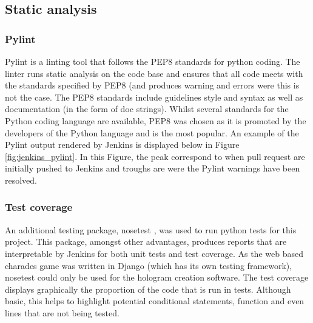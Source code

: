 \subsection{Static analysis}
\subsubsection{Pylint}
Pylint is a linting tool that follows the PEP8 standards \cite{pep8} for python coding. The linter runs static analysis on the code base and ensures that all code meets with the standards specified by PEP8 (and produces warning and errors were this is not the case. The PEP8 standards include guidelines style and syntax as well as documentation (in the form of doc strings). Whilst several standards for the Python coding language are available, PEP8 was chosen as it is promoted by the developers of the Python language and is the most popular. An example of the Pylint output rendered by Jenkins is displayed below in Figure \ref{fig:jenkins_pylint}. In this Figure, the peak correspond to when pull request are initially pushed to Jenkins and troughs are were the Pylint warnings have been resolved.
\begin{figure}[h!]
\end{figure}

\newpage

\subsubsection{Test coverage} 
An additional testing package, nosetest \cite{nosetest}, was used to run python tests for this project. This package, amongst other advantages, produces reports that are interpretable by Jenkins for both unit tests and test coverage. As the web based charades game was written in Django (which has its own testing framework), nosetest could only be used for the hologram creation software. The test coverage displays graphically the proportion of the code that is run in tests. Although basic, this helps to highlight potential conditional statements, function and even lines that are not being tested. 

